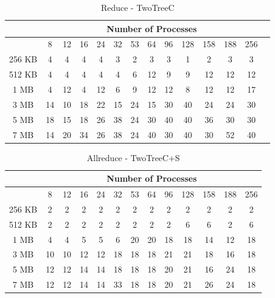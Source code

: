 \documentclass[sigplan,review,anonymous]{acmart}\settopmatter{printfolios=true,printccs=false,printacmref=false}
\begin{document}
\begin{table}[]
\caption{Reduce - TwoTreeC}
\begin{center}
\begin{tabular}{|c|c|c|c|c|c|c|c|c|c|c|c|c|c|}
\hline
& \multicolumn{12}{c|}{Number of Processes} \\
\hline
& 8 & 12 & 16 & 24 & 32 & 53 & 64 & 96 & 128 & 158 & 188 & 256\\
\hline
 256 KB & 4 & 4 & 4 & 4 & 3 & 2 & 3 & 3 & 1 & 2 & 3 & 3\\
 512 KB & 4 & 4 & 4 & 4 & 4 & 6 & 12 & 9 & 9 & 12 & 12 & 12\\
 1 MB & 4 & 12 & 4 & 12 & 6 & 9 & 12 & 12 & 8 & 12 & 12 & 17\\
 3 MB & 14 & 10 & 18 & 22 & 15 & 24 & 15 & 30 & 40 & 24 & 24 & 30\\
 5 MB & 18 & 15 & 18 & 26 & 38 & 24 & 30 & 40 & 40 & 36 & 30 & 30\\
 7 MB & 14 & 20 & 34 & 26 & 38 & 24 & 40 & 30 & 40 & 30 & 52 & 40\\
\hline
\end{tabular}
\end{center}
\end{table}

\begin{table}[]
\caption{Allreduce - TwoTreeC+S}
\begin{center}
\begin{tabular}{|c|c|c|c|c|c|c|c|c|c|c|c|c|}
\hline
 & \multicolumn{12}{c|}{Number of Processes} \\
\hline
 & 8 & 12 & 16 & 24 & 32 & 53 & 64 & 96 & 128 & 158 & 188 & 256\\
\hline
 256 KB & 2 & 2 & 2 & 2 & 2 & 2 & 2 & 2 & 2 & 2 & 2 & 2\\
 512 KB & 2 & 2 & 2 & 2 & 2 & 2 & 2 & 2 & 6 & 6 & 2 & 6\\
 1 MB & 4 & 4 & 5 & 5 & 6 & 20 & 20 & 18 & 18 & 14 & 12 & 18\\
 3 MB & 10 & 10 & 12 & 12 & 18 & 18 & 18 & 21 & 21 & 18 & 16 & 18\\
 5 MB & 12 & 12 & 14 & 14 & 18 & 18 & 18 & 20 & 21 & 16 & 24 & 18\\
 7 MB & 12 & 12 & 14 & 14 & 33 & 18 & 18 & 20 & 21 & 26 & 24 & 18\\
\hline
\end{tabular}
\end{center}
\end{table}

\end{document}
